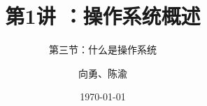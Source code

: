 


\title[第1讲]{第1讲 ：操作系统概述} %
\subtitle{第三节：什么是操作系统}
\author{向勇、陈渝} %
\date{\today} %



\begin{frame}
\titlepage %
\end{frame}

%
%


